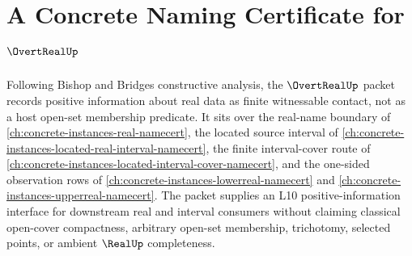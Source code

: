 \chapter{A Concrete Naming Certificate for $\OvertRealUp$}
\label{ch:concrete-instances-overt-real-namecert}

Following Bishop and Bridges constructive analysis, the $\OvertRealUp$ packet records positive information about real data as finite witnessable contact, not as a host open-set membership predicate. It sits over the real-name boundary of \autoref{ch:concrete-instances-real-namecert}, the located source interval of \autoref{ch:concrete-instances-located-real-interval-namecert}, the finite interval-cover route of \autoref{ch:concrete-instances-located-interval-cover-namecert}, and the one-sided observation rows of \autoref{ch:concrete-instances-lowerreal-namecert} and \autoref{ch:concrete-instances-upperreal-namecert}. The packet supplies an L10 positive-information interface for downstream real and interval consumers without claiming classical open-cover compactness, arbitrary open-set membership, trichotomy, selected points, or ambient $\RealUp$ completeness.

